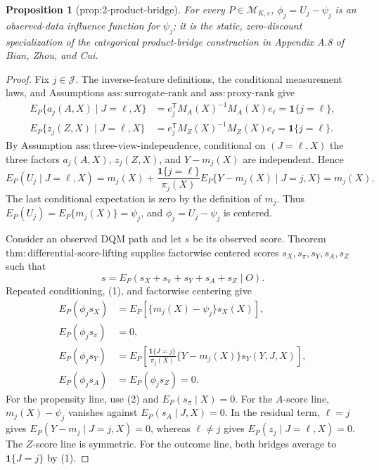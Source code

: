 \documentclass{article}
\newtheorem{proposition}{Proposition}
\begin{document}
\begin{proposition}[prop:2-product-bridge]\label{prop:2-product-bridge}
For every \(P\in\mathcal M_{K,\varepsilon}\), \(\phi_j=U_j-\psi_j\) is an observed-data influence function for \(\psi_j\); it is the static, zero-discount specialization of the categorical product-bridge construction in Appendix A.8 of Bian, Zhou, and Cui.
\end{proposition}
\begin{proof}
Fix \(j\in\mathcal J\).  The inverse-feature definitions, the conditional measurement laws, and Assumptions \(\mathrm{ass{:}surrogate\mbox{-}rank}\) and \(\mathrm{ass{:}proxy\mbox{-}rank}\) give
\[
\begin{aligned}
 E_P\{a_j(A,X)\mid J=\ell,X\}
 &=e_j^{\mathsf T}M_A(X)^{-1}M_A(X)e_\ell
 =\mathbf 1\{j=\ell\},\\
 E_P\{z_j(Z,X)\mid J=\ell,X\}
 &=e_j^{\mathsf T}M_Z(X)^{-1}M_Z(X)e_\ell
 =\mathbf 1\{j=\ell\}. \tag{1}
\end{aligned}
\]
By Assumption \(\mathrm{ass{:}three\mbox{-}view\mbox{-}independence}\), conditional on \((J=\ell,X)\) the three factors \(a_j(A,X)\), \(z_j(Z,X)\), and \(Y-m_j(X)\) are independent.  Hence
\[
 E_P(U_j\mid J=\ell,X)
 =m_j(X)+\frac{\mathbf 1\{j=\ell\}}{\pi_j(X)}
 E_P\{Y-m_j(X)\mid J=j,X\}=m_j(X). \tag{2}
\]
The last conditional expectation is zero by the definition of \(m_j\).  Thus \(E_P(U_j)=E_P\{m_j(X)\}=\psi_j\), and \(\phi_j=U_j-\psi_j\) is centered.

Consider an observed DQM path and let \(s\) be its observed score.  Theorem \(\mathrm{thm{:}differential\mbox{-}score\mbox{-}lifting}\) supplies factorwise centered scores \(s_X,s_\pi,s_Y,s_A,s_Z\) such that
\[
s=E_P(s_X+s_\pi+s_Y+s_A+s_Z\mid O).
\]
Repeated conditioning, (1), and factorwise centering give
\[
\begin{aligned}
 E_P(\phi_js_X)&=E_P[\{m_j(X)-\psi_j\}s_X(X)],\\
 E_P(\phi_js_\pi)&=0,\\
 E_P(\phi_js_Y)&=E_P\!\left[
 \frac{\mathbf 1\{J=j\}}{\pi_j(X)}
 \{Y-m_j(X)\}s_Y(Y,J,X)\right],\\
 E_P(\phi_js_A)&=E_P(\phi_js_Z)=0. \tag{3}
\end{aligned}
\]
For the propensity line, use (2) and \(E_P(s_\pi\mid X)=0\).  For the \(A\)-score line, \(m_j(X)-\psi_j\) vanishes against \(E_P(s_A\mid J,X)=0\).  In the residual term, \(\ell=j\) gives \(E_P(Y-m_j\mid J=j,X)=0\), whereas \(\ell\ne j\) gives \(E_P(z_j\mid J=\ell,X)=0\).  The \(Z\)-score line is symmetric.  For the outcome line, both bridges average to \(\mathbf 1\{J=j\}\) by (1).


\end{proof}
\end{document}
